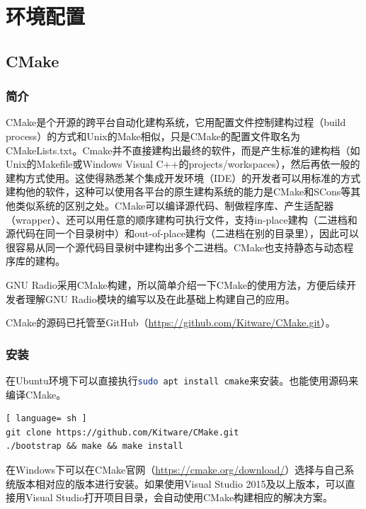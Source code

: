 \chapter{环境配置}
	\section{CMake}
		\subsection{简介}
			\par CMake是个开源的跨平台自动化建构系统，它用配置文件控制建构过程（build process）的方式和Unix的Make相似，只是CMake的配置文件取名为CMakeLists.txt。Cmake并不直接建构出最终的软件，而是产生标准的建构档（如Unix的Makefile或Windows Visual C++的projects/workspaces），然后再依一般的建构方式使用。这使得熟悉某个集成开发环境（IDE）的开发者可以用标准的方式建构他的软件，这种可以使用各平台的原生建构系统的能力是CMake和SCons等其他类似系统的区别之处。CMake可以编译源代码、制做程序库、产生适配器（wrapper）、还可以用任意的顺序建构可执行文件，支持in-place建构（二进档和源代码在同一个目录树中）和out-of-place建构（二进档在别的目录里），因此可以很容易从同一个源代码目录树中建构出多个二进档。CMake也支持静态与动态程序库的建构。
			\par GNU Radio采用CMake构建，所以简单介绍一下CMake的使用方法，方便后续开发者理解GNU Radio模块的编写以及在此基础上构建自己的应用。
			\par CMake的源码已托管至GitHub（\href{https://github.com/Kitware/CMake.git}{https://github.com/Kitware/CMake.git}）。
		\subsection{安装}
			\label{sec:CMake}
			\par 在Ubuntu环境下可以直接执行\lstinline[language=sh]{sudo apt install cmake}来安装。也能使用源码来编译CMake。
			\begin{lstlisting}[ language= sh ]
git clone https://github.com/Kitware/CMake.git
./bootstrap && make && make install
			\end{lstlisting}
			\par 在Windows下可以在CMake官网（\href{https://cmake.org/download/}{https://cmake.org/download/}）选择与自己系统版本相对应的版本进行安装。如果使用Visual Studio 2015及以上版本，可以直接用Visual Studio打开项目目录，会自动使用CMake构建相应的解决方案。
